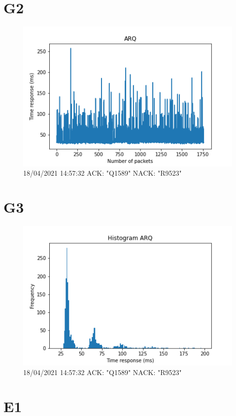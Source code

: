 \documentclass[hidelinks, 12pt, a4paper]{article}
\begin{document}
\pagebreak

\section{G2}

\begin{figure}[h!]
\centering
	\includegraphics[keepaspectratio, width=.8\textwidth]{arq.png}
	\caption{18/04/2021 14:57:32 ACK: "Q1589" NACK: "R9523"} 
\end{figure}


\section{G3}

\begin{figure}[h!]
\centering
	\includegraphics[keepaspectratio, width=.8\textwidth]{hist_arq.png}
	\caption{18/04/2021 14:57:32 ACK: "Q1589" NACK: "R9523"} 
\end{figure}

\pagebreak

\section{E1}
\end{document}
